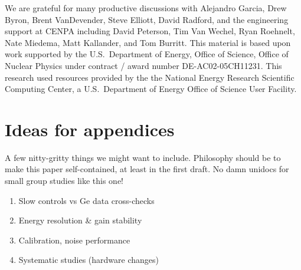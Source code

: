 \documentclass[nofootinbib,superscriptaddress, aps, prc, 
10pt, amsmath, amssymb, bibnotes,
altaffilletter, twocolumn, floatfix]{revtex4-2}
\begin{document}
\begin{acknowledgments}

    We are grateful for many productive discussions with Alejandro Garcia, Drew Byron, Brent VanDevender, Steve Elliott, David Radford, and the engineering support at CENPA including David Peterson, Tim Van Wechel, Ryan Roehnelt, Nate Miedema, Matt Kallander, and Tom Burritt. 
    This material is based upon work supported by the U.S.~Department of Energy, Office of Science, Office of Nuclear Physics under contract / award number DE-AC02-05CH11231.  %
    This research used resources provided by the the National Energy Research Scientific Computing Center, a U.S.~Department of Energy Office of Science User Facility.

\end{acknowledgments}

\appendix

\section{Ideas for appendices}

A few nitty-gritty things we might want to include.  
Philosophy should be to make this paper self-contained, at least in the first draft.  
No damn unidocs for small group studies like this one!

\begin{enumerate}
    \item Slow controls vs Ge data cross-checks
    \item Energy resolution \& gain stability
    \item Calibration, noise performance
    \item Systematic studies (hardware changes)
\end{enumerate}



\appendix





\end{document}
